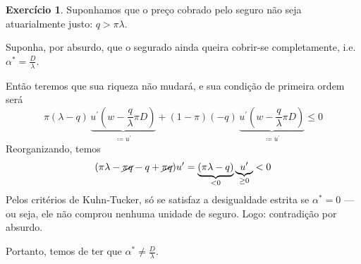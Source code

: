\documentclass[12pt]{article}
\numberwithin{equation}{section}
\theoremstyle{plain}
\theoremstyle{definition}
\newtheorem{exercise}{Exercício}
\theoremstyle{remark}
\begin{document}
  
  
  




\begin{exercise}
  Suponhamos que o preço cobrado pelo seguro não seja atuarialmente justo: \(q > \pi\lambda\).
    
    Suponha, por absurdo, que o segurado ainda queira cobrir-se completamente, i.e.~\(\alpha^{*} = \frac{D}{\lambda}\).
    
    Então teremos que sua riqueza não mudará, e sua condição de primeira ordem será
    \[
      \pi (\lambda - q)\, \underbrace{ u^\prime\left( w - \frac{q}{\lambda} \pi D  \right) }_{ \coloneqq u^\prime } + (1-\pi) (-q) \, \underbrace{ u^\prime\left( w - \frac{q}{\lambda} \pi D \right) }_{ \coloneqq u^\prime } \leq 0
      \]
      Reorganizando, temos
      \[
        (\pi \lambda - \cancel{ \pi q } - q + \cancel{ \pi q }) u^\prime = \underbrace{ (\pi\lambda - q) }_{ < 0 } \underbrace{ u^\prime }_{ \geq 0 } < 0
        \]
        Pelos critérios de Kuhn-Tucker, só se satisfaz a desigualdade estrita se \(\alpha^{*} = 0\) --- ou seja, ele não comprou nenhuma unidade de seguro. Logo: contradição por absurdo.
        
        Portanto, temos de ter que \(\alpha^{*} \neq \frac{D}{\lambda}\).
        
\end{exercise}
\end{document}
